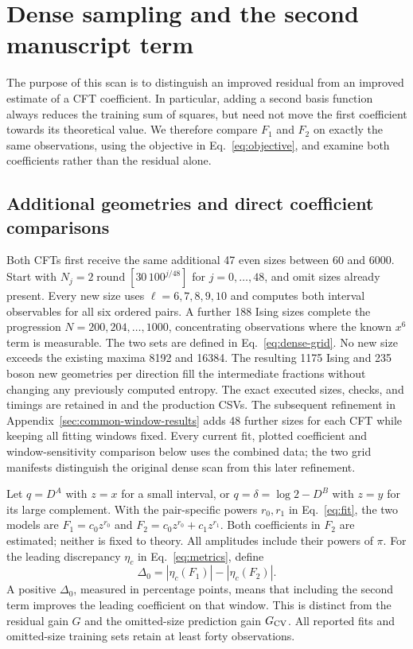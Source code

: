 \clearpage
\section{Dense sampling and the second manuscript term}
\label{sec:dense-second-order}
The purpose of this scan is to distinguish an improved residual from
an improved estimate of a CFT coefficient. In particular, adding a
second basis function always reduces the training sum of squares, but
need not move the first coefficient towards its theoretical value.
We therefore compare $F_1$ and $F_2$ on exactly the same observations,
using the objective in Eq.~\eqref{eq:objective}, and examine both
coefficients rather than the residual alone.

\subsection{Additional geometries and direct coefficient comparisons}
Both CFTs first receive the same additional 47 even sizes between 60 and
6000. Start with $N_j=2\operatorname{round}[30\,100^{j/48}]$ for
$j=0,\ldots,48$, and omit sizes already present. Every new size uses
$\ell=6,7,8,9,10$ and computes both interval observables for all six
ordered pairs. A further 188 Ising sizes complete the progression
$N=200,204,\ldots,1000$, concentrating observations where the known
$x^6$ term is measurable. The two sets are defined in
Eq.~\eqref{eq:dense-grid}. No new size exceeds the existing maxima
8192 and 16384. The resulting 1175 Ising and 235 boson new geometries per direction fill
the intermediate fractions without changing any previously computed
entropy. The exact executed sizes, checks, and timings are retained
in  and the production CSVs.
The subsequent refinement in Appendix~\ref{sec:common-window-results}
adds 48 further sizes for each CFT while keeping all fitting windows
fixed. Every current fit, plotted coefficient and window-sensitivity
comparison below uses the combined data; the two grid manifests
distinguish the original dense scan from this later refinement.

Let $q=D^A$ with $z=x$ for a small interval, or
$q=\delta=\log 2-D^B$ with $z=y$ for its large complement. With the
pair-specific powers $r_0,r_1$ in Eq.~\eqref{eq:fit}, the two models are
$F_1=c_0z^{r_0}$ and $F_2=c_0z^{r_0}+c_1z^{r_1}$.
Both coefficients in $F_2$ are estimated; neither is fixed to theory.
All amplitudes include their powers of $\pi$.
For the leading discrepancy $\eta_c$ in Eq.~\eqref{eq:metrics}, define
\begin{equation}
 \Delta_0=|\eta_c(F_1)|-|\eta_c(F_2)|.
 \label{eq:dense-coefficient-gain}
\end{equation}
A positive $\Delta_0$, measured in percentage points, means that
including the second term improves the leading coefficient on that
window. This is distinct from the residual gain $G$ and the omitted-size
prediction gain $G_{\rm CV}$. All reported fits and omitted-size
training sets retain at least forty observations.

